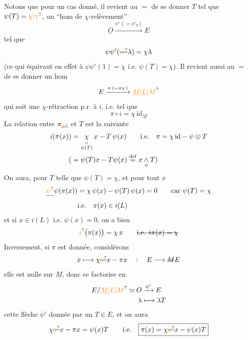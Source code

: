 Notons que pour un  cas donné, il revient au $=$ de se donner $T$ tel que $\psi(T)=\unsure{\chi|\gamma}$,  un ``hom de $\chi$-relèvement''
\[
\underline{O}\xrightarrow{\psi'\,(=\psi'_T)}E
\]
tel que
\[
\psi\psi'(\deleted{\unsure{=}}\lambda)=\chi\lambda
\]
(ce qui équivaut en effet à $\psi\psi'(1)=\chi$ i.e. $\psi(T)=\chi$).
Il revient aussi au $=$ de se donner un hom
\[
E\xrightarrow{\pi\,(=\pi_T)}\unsure{\underline M|\underline L|M}
\]
qui soit une $\chi$-rétraction p.r. à $i$, i.e. tel que
\[
\pi\circ i=\chi\,\mathrm{id}_{\underline M}
\]
La relation entre $\pi_{\deleted{\unsure{T}}}$ et $T$ est la suivante
\[
\begin{aligned}
i(\pi(x))&=\underset{\substack{\shortparallel\\\psi(T)}}{\chi}\,x-T\,\psi(x)
\qquad\text{i.e.}\quad\pi=\chi\,\mathrm{id}-\psi\otimes T\\
(&=\psi(T)x-T\psi(x)\overset{\mathrm{def}}{=}x\mathbin{\underset{\psi}{\wedge}}T)
\end{aligned}
\]
On aura, pour $T$  telle que $\psi(T)=\chi$, et pour tout $x$
\[
\begin{aligned}
\deleted{\unsure{\psi}}\psi(\pi(x))&=\chi\,\psi(x)-\psi(T)\,\psi(x)=0\qquad\text{car }\psi(T)=\chi\\
&\text{i.e.}\quad\pi(x)\in i(L)
\end{aligned}
\]
et si $x\in i(L)$ i.e. $\psi(x)=0$, on a bien
\[
\unsure{i}\bigl(\pi(x)\bigr)=\chi\,x\qquad \deleted{\text{i.e. }i\pi(x)=\chi}
\]
Inversement, si $\pi$ est donnée, considérons
\[
x\longmapsto\chi\deleted{\unsure{a}}x-\pi x\quad:\quad E\longrightarrow\deleted{M}E
\]
elle est nulle sur $\underline M$, donc se factorise en
\[
\begin{aligned}
E/\unsure{\underline M|L|M}\simeq O&\xrightarrow{\psi'}E\\
\lambda&\longmapsto\lambda T
\end{aligned}
\]
cette flèche $\psi'$ donnée par un $T\in E$, et on aura
\[
\chi\deleted{\unsure{a}}x-\pi x=\psi(x)T\qquad\text{i.e.}\quad\boxed{\pi(x)=\chi\deleted{\unsure{a}}x-\psi(x)T}
\]
